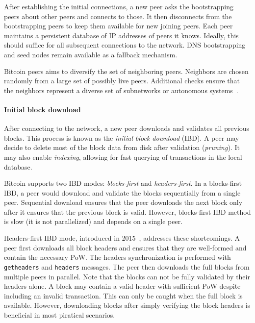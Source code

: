 After establishing the initial connections, a new peer asks the bootstrapping peers about other peers and connects to those.
It then disconnects from the bootstrapping peers to keep them available for new joining peers.
Each peer maintains a persistent database of IP addresses of peers it knows.
Ideally, this should suffice for all subsequent connections to the network.
DNS bootstrapping and seed nodes remain available as a fallback mechanism.

Bitcoin peers aims to diversify the set of neighboring peers.
Neighbors are chosen randomly from a large set of possibly live peers.
Additional checks ensure that the neighbors represent a diverse set of subnetworks or autonomous systems~\cite{Naumenko2019a}.


\paragraph{Initial block download}

After connecting to the network, a new peer downloads and validates all previous blocks.
This process is known as the \textit{initial block download} (IBD).
A peer may decide to delete most of the block data from disk after validation (\textit{pruning}).
It may also enable \textit{indexing}, allowing for fast querying of transactions in the local database.

Bitcoin supports two IBD modes: \textit{blocks-first} and \textit{headers-first}.
In a blocks-first IBD, a peer would download and validate the blocks sequentially from a single peer.
Sequential download ensures that the peer downloads the next block only after it ensures that the previous block is valid.
However, blocks-first IBD method is slow (it is not parallelized) and depends on a single peer.

Headers-first IBD mode, introduced in 2015~\cite{Core2015}, addresses these shortcomings.
A peer first downloads all block headers and ensures that they are well-formed and contain the necessary PoW.
The headers synchronization is performed with \texttt{getheaders} and \texttt{headers} messages.
The peer then downloads the full blocks from multiple peers in parallel.
Note that the blocks can not be fully validated by their headers alone.
A block may contain a valid header with sufficient PoW despite including an invalid transaction.
This can only be caught when the full block is available.
However, downloading blocks after simply verifying the block headers is beneficial in most piratical scenarios.


